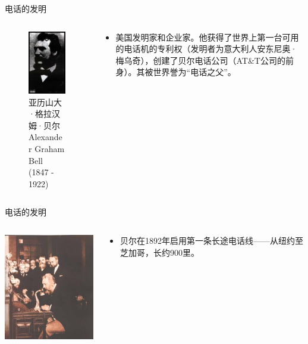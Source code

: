 \documentclass{ctexbeamer}
\begin{document}
\begin{frame}{电话的发明}
  \begin{columns}
    \begin{column}{0.4\linewidth}
    \begin{figure}
      \includegraphics[width=3.2cm]{Bell.png}
      \caption{亚历山大·格拉汉姆·贝尔Alexander Graham Bell (1847 - 1922)}
    \end{figure}
    \end{column}
    \begin{column}{0.6\linewidth}
      \begin{itemize}
        \item 美国发明家和企业家。他获得了世界上第一台可用的电话机的专利权（发明者为意大利人安东尼奥·梅乌奇），创建了贝尔电话公司（AT\&T公司的前身）。其被世界誉为“电话之父”。
      \end{itemize}
    \end{column}
  \end{columns}
\end{frame}

\begin{frame}{电话的发明}
  \begin{columns}
    \begin{column}{0.5\linewidth}
      \includegraphics[width=5.5cm]{Bell2}
    \end{column}
    \begin{column}{0.5\linewidth}
      \begin{itemize}
        \item 贝尔在1892年启用第一条长途电话线——从纽约至芝加哥，长约900里。
      \end{itemize}
    \end{column}
  \end{columns}
\end{frame}
\end{document}
